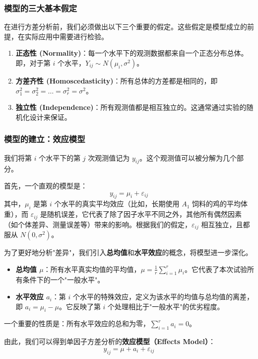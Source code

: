 \documentclass[12pt, a4paper]{amsart}
\begin{document}
\subsubsection{模型的三大基本假定}
在进行方差分析前，我们必须做出以下三个重要的假定。这些假定是模型成立的前提，在实际应用中需要进行检验。
\begin{enumerate}
    \item \textbf{正态性 (Normality)}：每一个水平下的观测数据都来自一个正态分布总体。即，对于第 $i$ 个水平，$Y_{ij} \sim N(\mu_i, \sigma^2)$。
    \item \textbf{方差齐性 (Homoscedasticity)}：所有总体的方差都是相同的，即 $\sigma_1^2 = \sigma_2^2 = \dots = \sigma_r^2 = \sigma^2$。
    \item \textbf{独立性 (Independence)}：所有观测值都是相互独立的。这通常通过实验的随机化设计来保证。
\end{enumerate}

\subsubsection{模型的建立：效应模型}
我们将第 $i$ 个水平下的第 $j$ 次观测值记为 $y_{ij}$。这个观测值可以被分解为几个部分。

首先，一个直观的模型是：
$$ y_{ij} = \mu_i + \varepsilon_{ij} $$
其中，$\mu_i$ 是第 $i$ 个水平的真实平均效应（比如，长期使用 $A_1$ 饲料的鸡的平均体重），而 $\varepsilon_{ij}$ 是随机误差，它代表了除了因子水平不同之外，其他所有偶然因素（如个体差异、测量误差等）带来的影响。根据我们的假定，$\varepsilon_{ij}$ 相互独立，且都服从 $N(0, \sigma^2)$。

为了更好地分析"差异"，我们引入\textbf{总均值}和\textbf{水平效应}的概念，将模型进一步深化。

\begin{itemize}
    \item \textbf{总均值 $\mu$}：所有水平真实均值的平均值，$\mu = \frac{1}{r} \sum_{i=1}^{r} \mu_i$。它代表了本次试验所有条件下的一个"一般水平"。
    \item \textbf{水平效应 $a_i$}：第 $i$ 个水平的特殊效应，定义为该水平的均值与总均值的离差，即 $a_i = \mu_i - \mu$。它反映了第 $i$ 个处理相比于"一般水平"的优劣程度。
\end{itemize}

一个重要的性质是：所有水平效应的总和为零，$\sum_{i=1}^{r} a_i = 0$。

由此，我们可以得到单因子方差分析的\textbf{效应模型（Effects Model）}：
$$ y_{ij} = \mu + a_i + \varepsilon_{ij} $$
\end{document}
